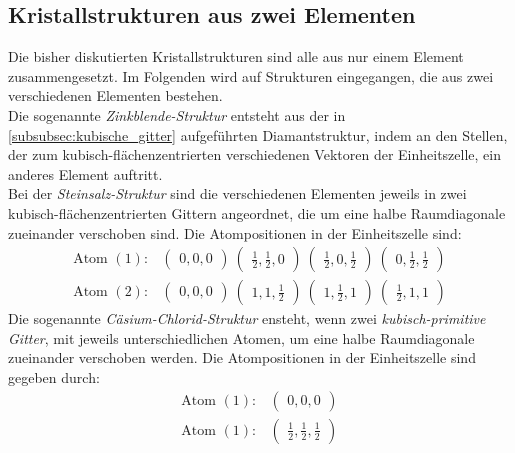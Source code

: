 \subsection{Kristallstrukturen aus zwei Elementen}
\label{subsec:2atome}
Die bisher diskutierten Kristallstrukturen sind alle aus nur
einem Element zusammengesetzt. Im Folgenden wird auf Strukturen
eingegangen, die aus zwei verschiedenen Elementen bestehen.\\
Die sogenannte \textit{Zinkblende-Struktur} entsteht aus der
in \ref{subsubsec:kubische_gitter}
aufgeführten Diamantstruktur, indem an den Stellen, der zum
kubisch-flächenzentrierten verschiedenen Vektoren der Einheitszelle,
ein anderes Element auftritt.\\
Bei der \textit{Steinsalz-Struktur}
sind die verschiedenen Elementen
jeweils in zwei kubisch-flächenzentrierten Gittern angeordnet, die um eine
halbe Raumdiagonale zueinander verschoben sind. Die Atompositionen
in der Einheitszelle sind:
\begin{align}
\label{eqn:5*}
\text{Atom }(1) :&
\begin{pmatrix}
0, 0, 0
\end{pmatrix}\
\begin{pmatrix}
\frac{1}{2}, \frac{1}{2}, 0
\end{pmatrix}\
\begin{pmatrix}
\frac{1}{2}, 0, \frac{1}{2}
\end{pmatrix}\
\begin{pmatrix}
0, \frac{1}{2}, \frac{1}{2}
\end{pmatrix}\\
\label{eqn:6*}
\text{Atom }(2) :&
\begin{pmatrix}
0, 0, 0
\end{pmatrix}\
\begin{pmatrix}
1, 1, \frac{1}{2}
\end{pmatrix}\
\begin{pmatrix}
1, \frac{1}{2}, 1
\end{pmatrix}\
\begin{pmatrix}
\frac{1}{2}, 1, 1
\end{pmatrix}
\end{align}
Die sogenannte \textit{Cäsium-Chlorid-Struktur}
ensteht, wenn zwei \textit{kubisch-primitive Gitter}, mit jeweils
unterschiedlichen Atomen, um eine halbe Raumdiagonale zueinander
verschoben werden. Die Atompositionen in der Einheitszelle
sind gegeben durch:
\begin{align}
\label{eqn:7*}
\text{Atom }(1) :&
\begin{pmatrix}
0, 0, 0
\end{pmatrix}\\
\label{eqn:8*}
\text{Atom }(1) :&
\begin{pmatrix}
\frac{1}{2}, \frac{1}{2}, \frac{1}{2}
\end{pmatrix}
\end{align}
